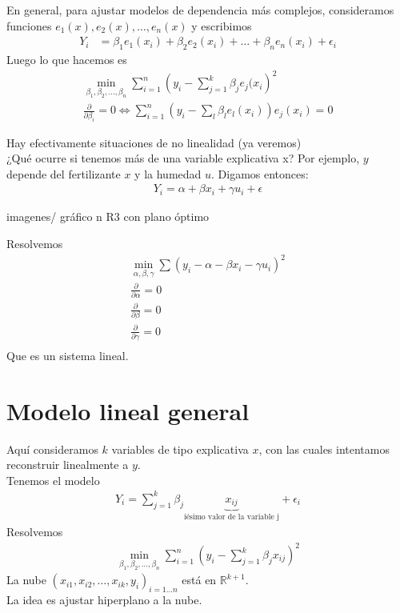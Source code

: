 \documentclass[10pt]{article}
\theoremstyle{plain}
\theoremstyle{definition}
\begin{document}
 En general, para ajustar modelos de dependencia más complejos, consideramos funciones $e_{1}(x), e_{2}(x),\ldots, e_{n}(x)$ y  escribimos
 \begin{align*}
 Y_{i} &= \beta_{1}e_{1}(x_{i}) + \beta_{2}e_{2}(x_{i}) + \ldots + \beta_{n} e_{n}(x_{i}) + \epsilon_{i}
 \end{align*}
 Luego lo que hacemos es
 \begin{align*}
 \min_{\beta_{1},\beta_{2},\ldots, \beta_{n}} \sum_{i=1}^n \left(y_{i} - \sum_{j=1}^k \beta_{j} e_{j}(x_{i}\right)^2\\
\frac{\partial}{\partial \beta_{i}} = 0 \Leftrightarrow \sum_{i=1}^n \left(y_{i}- \sum_{l}\beta_{l}e_{l}(x_{i})\right)e_{j}(x_{i}) = 0
 \end{align*}
 
 Hay efectivamente situaciones de no linealidad (ya veremos)\\
 
 ¿Qué ocurre si tenemos más de una variable explicativa x? Por ejemplo, $y$ depende del fertilizante $x$  y la humedad $u$. Digamos entonces:
 \begin{align*}
 Y_{i} = \alpha + \beta x_{i} + \gamma u_{i} + \epsilon
 \end{align*}
 \begin{center}
 imagenes/ gráfico n R3 con plano óptimo
 \end{center}
 Resolvemos 
 \begin{align*}
 \min_{\alpha,\beta,\gamma} \sum (y_{i}- \alpha - \beta x_{i} - \gamma u_{i})^2\\
\frac{\partial}{\partial \alpha} = 0\\
\frac{\partial}{\partial \beta} = 0\\
\frac{\partial}{\partial \gamma} = 0\\
 \end{align*}
 Que es un sistema lineal.
 \section{Modelo lineal general}
 Aquí consideramos $k$ variables de tipo explicativa $x$, con las cuales intentamos reconstruir linealmente a $y$.\\
 
 Tenemos el modelo
 \begin{align*}
 Y_{i} = \sum_{j=1}^k \beta_{j} \underbrace{x_{ij}}_{\text{iésimo valor de la variable j}} + \epsilon_{i}
 \end{align*}
 Resolvemos
 \begin{align*}
 \min_{\beta_{1},\beta_{2},\ldots, \beta_{n}} \sum_{i=1}^n (y_{i}- \sum_{j=1}^k \beta_{j}x_{ij})^2
 \end{align*}
 La nube $(x_{i1},x_{i2},\ldots,x_{ik}, y_{i})_{i=1\ldots n}$ está en $\mathbb{R}^{k+1}$.\\
 La idea es ajustar hiperplano a la nube.
\end{document}
